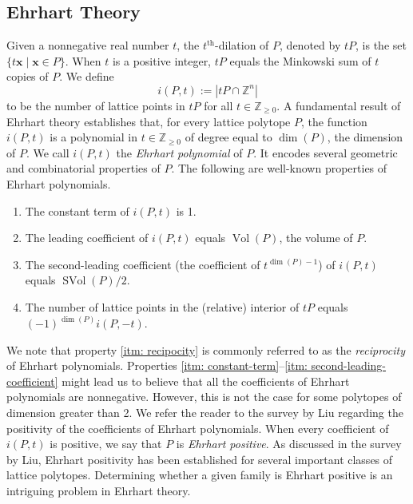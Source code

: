 \documentclass[11pt,a4paper]{article}
\newcommand{\vct}[1]{\boldsymbol{#1}}
\newcommand{\Z}{\mathbb{Z}}
\newcommand{\Vol}{\operatorname{Vol}}
\newcommand{\SVol}{\operatorname{SVol}}
\newcommand{\1}{\mathbf{1}}
\theoremstyle{plain}
\theoremstyle{definition}
\begin{document}
\subsection{Ehrhart Theory}\label{sec:Ehrhart-theory}
Given a nonnegative real number $t$, the $t^{\mathrm{th}}$-dilation of $P$, denoted by $tP$, is the set $\{t\vct{x}\mid \vct{x}\in P\}$. When $t$ is a positive integer, $tP$ equals the Minkowski sum of $t$ copies of $P$. We define 
\[
i(P,t):=|tP\cap\Z^n|
\]
to be the number of lattice points in $tP$ for all $t \in \Z_{\geq 0}$. A fundamental result of Ehrhart theory \cite{Ehrhart1962} establishes that, for every lattice polytope $P$, the function $i(P,t)$ is a polynomial in $t\in\Z_{\geq 0}$ of degree equal to $\dim(P)$, the dimension of $P$. We call $i(P,t)$ the \emph{Ehrhart polynomial} of $P$. It encodes several geometric and combinatorial properties of $P$. The following are well-known properties of Ehrhart polynomials.
\begin{enumerate}
    \item\label{itm: constant-term} The constant term of $i(P,t)$ is 1.
    \item\label{itm: leading-coefficient} The leading coefficient of $i(P,t)$ equals $\Vol(P)$, the volume of $P$.
    \item\label{itm: second-leading-coefficient} The second-leading coefficient (the coefficient of $t^{\dim(P)-1}$) of $i(P,t)$ equals $\SVol(P)/2$.
    \item\label{itm: recipocity} The number of lattice points in the (relative) interior of $tP$ equals $(-1)^{\dim(P)}i(P,-t).$
\end{enumerate}

We note that property \ref{itm: recipocity} is commonly referred to as the \emph{reciprocity} of Ehrhart polynomials. Properties \ref{itm: constant-term}--\ref{itm: second-leading-coefficient} might lead us to believe that all the coefficients of Ehrhart polynomials are nonnegative. However, this is not the case for some polytopes of dimension greater than 2. We refer the reader to the survey \cite{Liu2019} by Liu regarding the positivity of the coefficients of Ehrhart polynomials. When every coefficient of $i(P,t)$ is positive, we say that $P$ is \emph{Ehrhart positive}. As discussed in the survey by Liu, Ehrhart positivity has been established for several important classes of lattice polytopes. Determining whether a given family is Ehrhart positive is an intriguing problem in Ehrhart theory.
\end{document}
